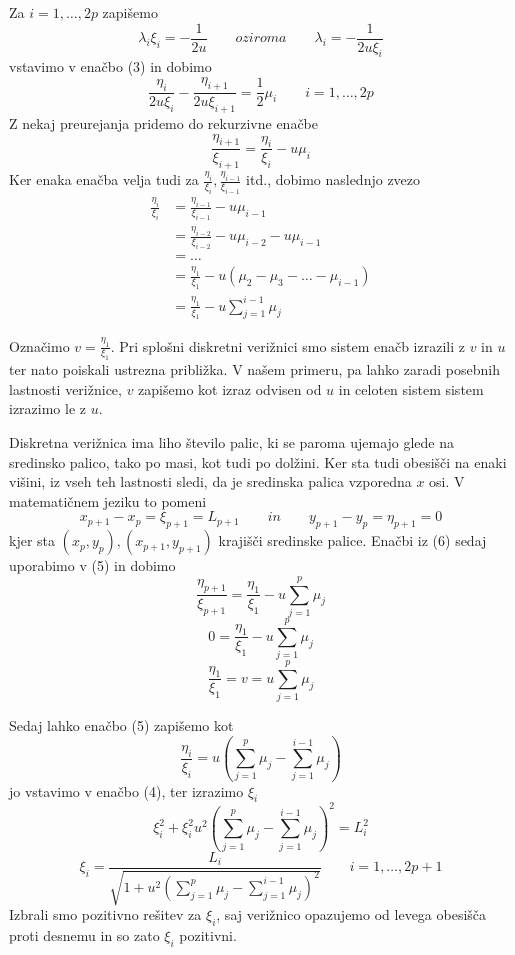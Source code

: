\documentclass[A4paper, 11pt]{article}
\begin{document}
Za $i=1, \ldots, 2p$ zapišemo
\[ \lambda_i \xi_i = - \frac{1}{2u} \qquad oziroma \qquad \lambda_i = - \frac{1}{2u \xi_i}  \]
vstavimo v enačbo (3) in dobimo
\[ \frac{\eta_i}{2u \xi_i} - \frac{\eta_{i+1}}{2u \xi_{i+1}} = \frac{1}{2} \mu_i \qquad i=1, \ldots, 2p \]
Z nekaj preurejanja pridemo do rekurzivne enačbe
\[ \frac{\eta_{i+1}}{\xi_{i+1}} =  \frac{\eta_i}{\xi_i} - u \mu_i \]
Ker enaka enačba velja tudi za $\frac{\eta_i}{\xi_i}, \frac{\eta_{i-1}}{\xi_{i-1}}$ itd., dobimo naslednjo zvezo
\begin{equation}
\begin{split}
\frac{\eta_{i}}{\xi_{i}} & =  \frac{\eta_{i-1}}{\xi_{i-1}} - u \mu_{i-1}  \\
                                               & =  \frac{\eta_{i-2}}{\xi_{i-2}} - u \mu_{i-2} - u \mu_{i-1}  \\
                                               & = \ldots  \\
                                               & = \frac{\eta_1}{\xi_1} - u (\mu_2 - \mu_3 - \ldots - \mu_{i-1})  \\
                                               & = \frac{\eta_1}{\xi_1} - u \sum_{j=1}^{i-1} \mu_j
\end{split}
\end{equation}

Označimo $v = \frac{\eta_1}{\xi_1}$. Pri splošni diskretni verižnici smo sistem enačb izrazili z $v$ in $u$ ter nato poiskali ustrezna približka. V našem primeru, pa lahko zaradi posebnih lastnosti verižnice, $v$ zapišemo kot izraz odvisen od $u$ in celoten sistem sistem izrazimo le z $u$.

Diskretna verižnica ima liho število palic, ki se paroma ujemajo glede na sredinsko palico, tako po masi, kot tudi po dolžini. Ker sta tudi obesišči na enaki višini, iz vseh teh lastnosti sledi, da je sredinska palica vzporedna $x$ osi. V matematičnem jeziku to pomeni
\begin{equation}
x_{p+1} - x_p = \xi_{p+1} = L_{p+1} \qquad in \qquad y_{p+1} - y_p = \eta_{p+1} = 0
\end{equation}
kjer sta $(x_p,y_p), (x_{p+1}, y_{p+1})$ krajišči sredinske palice.
Enačbi iz (6) sedaj uporabimo v (5) in dobimo
\[ \frac{\eta_{p+1}}{\xi_{p+1}} =  \frac{\eta_1}{\xi_1} - u \sum_{j=1}^{p} \mu_j \]
\[ 0 =  \frac{\eta_1}{\xi_1} - u \sum_{j=1}^{p} \mu_j \]
\[ \frac{\eta_1}{\xi_1} = v =  u \sum_{j=1}^{p} \mu_j \]

Sedaj lahko enačbo (5) zapišemo kot
\begin{equation} 
\frac{\eta_{i}}{\xi_{i}} = u \left (\sum_{j=1}^{p} \mu_j - \sum_{j=1}^{i-1} \mu_j \right )
\end{equation}
jo vstavimo v enačbo (4), ter izrazimo $\xi_i$
\[ \xi_i ^2 + \xi_i ^ 2 u^2 \left (\sum_{j=1}^{p} \mu_j - \sum_{j=1}^{i-1} \mu_j \right ) ^2 = L_i ^2 \]
\begin{equation}
\xi_i = \frac{L_i}{\sqrt{1 + u^2 \left (\sum_{j=1}^{p} \mu_j - \sum_{j=1}^{i-1} \mu_j \right ) ^2}} \qquad i = 1, \ldots, 2p+1
\end{equation}
Izbrali smo pozitivno rešitev za $\xi_i$, saj verižnico opazujemo od levega obesišča proti desnemu in so zato $\xi_i$ pozitivni.
\end{document}

